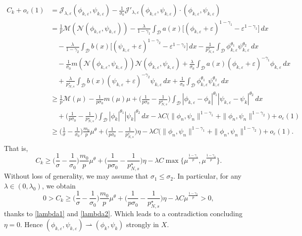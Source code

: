 \documentclass[10pt,a4paper]{amsart}
\numberwithin{equation}{section}
\begin{document}
\begin{align*}
C_k+o_\varepsilon(1)&=\mathcal{J}_{\lambda,\varepsilon}(\phi_{k,\varepsilon},\psi_{k,\varepsilon})-\frac{1}{\sigma_0}\mathcal{J}'_{\lambda,\varepsilon}(\phi_{k,\varepsilon},\psi_{k,\varepsilon})\cdot (\phi_{k,\varepsilon},\psi_{k,\varepsilon})\\
&=\frac{1}{p}\mathscr{M}(\mathcal{N}(\phi_{k,\varepsilon},\psi_{k,\varepsilon}))-\frac{\lambda}{1-\gamma_1}\int_\mathcal{D} a(x)\Big[(\phi_{k,\varepsilon}+\varepsilon)^{1-\gamma_1}-\varepsilon^{1-\gamma_1}\Big]\,dx\\
&\quad-\frac{\lambda}{1-\gamma_2}\int_\mathcal{D} b(x)\Big[(\psi_{k,\varepsilon}+\varepsilon)^{1-\gamma_2}-\varepsilon^{1-\gamma_2}\Big]\,dx-\frac{1}{p^\star_{N,s}}\int_\mathcal{D}  \phi_{k,\varepsilon}^{\theta_1}\psi_{k,\varepsilon}^{\theta_2}\,dx\\
&\quad-\frac{1}{\sigma_0}m(\mathcal{N}(\phi_{k,\varepsilon},\psi_{k,\varepsilon}))\mathcal{N}(\phi_{k,\varepsilon},\psi_{k,\varepsilon})+\frac{\lambda}{\sigma_0}\int_\mathcal{D} a(x) (\phi_{k,\varepsilon}+\varepsilon)^{-\gamma_1}\phi_{k,\varepsilon}\,dx \\
&\quad+\frac{\lambda}{p^\star_{N,s}}\int_\mathcal{D}b(x)(\psi_{k,\varepsilon}+\varepsilon)^{-\gamma_2}\psi_{k,\varepsilon}\,dx+\frac{1}{\sigma_0}\int_\mathcal{D}\phi_{k,\varepsilon}^{\theta_1}\psi_{k,\varepsilon}^{\theta_2}\,dx\\
&\geq\frac{1}{p}\mathscr{M}(\mu)-\frac{1}{p\sigma_0}m(\mu)\mu+\Big(\frac{1}{p\sigma_0}-\frac{1}{p^\star_{N,s}}\Big)\int_\mathcal{D} |\phi_{k,\varepsilon}-\phi_k|^{\theta_1}|\psi_{k,\varepsilon}-\psi_k|^{\theta_2}\,dx\\
&\quad+\Big(\frac{1}{p\sigma_0}-\frac{1}{p^\star_{N,s}}\Big)\int_\mathcal{D} |\phi_k|^{\theta_1}|\psi_k|^{\theta_2}\,dx-\lambda C\Big(\| \phi_n,\psi_n\|^{1-\gamma_1}+ \| \phi_n,\psi_n\|^{1-\gamma_2}\Big)+o_\varepsilon(1)\\
&\geq\Big(\frac{1}{\sigma}-\frac{1}{\sigma_0}\Big)\frac{m_0}{p}\mu^\theta+\Big(\frac{1}{p\sigma_0}-\frac{1}{p^\star_{N,s}}\Big)\eta-\lambda C\Big(\| \phi_n,\psi_n\|^{1-\gamma_1}+ \| \phi_n,\psi_n\|^{1-\gamma_2}\Big)+o_\varepsilon(1).\\
\end{align*}
That is,
$$
C_k\geq  \Big(\frac{1}{\sigma}-\frac{1}{\sigma_0}\Big)
\frac{m_0}{p}\mu^\theta+\Big(\frac{1}{p\sigma_0}-\frac{1}{p^\star_{N,s}}\Big)
\eta-\lambda C \max\lbrace \mu^\frac{1-\gamma_1}{p},\mu^\frac{1-\gamma_2}{p} \rbrace.
$$
Without loss of generality, we may assume that $\sigma_1\leq\sigma_2$. 
In particular, for any $\lambda\in (0,\lambda_0)$, we obtain
$$
0>C_k\geq \Big(\frac{1}{\sigma}-\frac{1}{\sigma_0}\Big)\frac{m_0}{p}\mu^\theta
+\Big(\frac{1}{p\sigma_0}-\frac{1}{p^\star_{N,s}}\Big)\eta
-\lambda C \mu^\frac{1-\gamma_2}{p}>0, 
$$
thanks to \eqref{lambda1} and \eqref{lambda2}. Which leads to a contradiction concluding 
$\eta=0$. Hence $(\phi_{k,\varepsilon},\psi_{k,\varepsilon})
\rightharpoonup (\phi_k,\psi_k)$ strongly in $X$.
\smallskip
\end{document}
